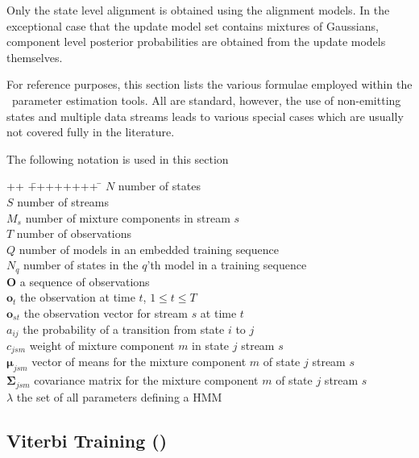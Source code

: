 Only the state level alignment is obtained using the alignment models.
In the exceptional case that the update model set contains mixtures of
Gaussians, component level posterior probabilities are obtained from
the update models themselves.


For reference purposes, this section lists the various formulae 
employed within the \HTK\ parameter estimation tools. 
All are standard, however, the use of non-emitting
states and multiple data streams leads to various special cases which are
usually not covered fully in the literature.

The following notation is used in this section
\begin{tabbing}
++ \= ++++++++ \= \kill
\> $N$ \> number of states \\
\> $S$ \> number of streams \\
\> $M_s$ \> number of mixture components in stream $s$\\
\> $T$ \> number of observations \\
\> $Q$ \> number of models in an embedded training sequence \\
\> $N_q$ \> number of states in the $q$'th model in a training sequence \\
\> $\bm{O}$      \> a sequence of observations \\
\> $\bm{o}_t$    \> the observation at time $t$, $1 \leq t \leq T $ \\
\> $\bm{o}_{st}$ \> the observation vector for stream $s$ at time $t$ \\
\> $a_{ij}$       \> the probability of a transition from state $i$ to $j$ \\
\> $c_{jsm}$    \> weight of mixture component $m$ in state $j$ stream $s$\\
\> $\bm{\mu}_{jsm}$  \> vector of means for the mixture component $m$ of state $j$
                        stream $s$\\ 
\> $\bm{\Sigma}_{jsm}$  \> covariance matrix for the mixture component $m$ 
                         of state $j$  stream $s$ \\
\> $\lambda$ \> the set of all parameters defining a HMM
\end{tabbing}

\subsection{Viterbi Training ()}


